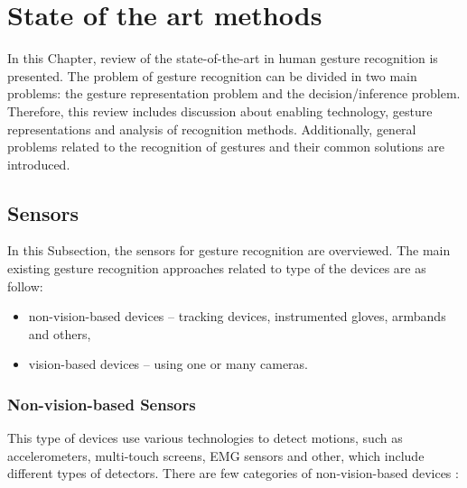 \section{State of the art methods}
In this Chapter, review of the state-of-the-art in human gesture recognition is presented. The problem of gesture recognition can be divided in two main problems: the gesture representation problem and the decision/inference problem. Therefore, this review includes discussion about enabling technology, gesture representations and analysis of recognition methods. Additionally, general problems related to the recognition of gestures and their common solutions are introduced.

\subsection{Sensors}
In this Subsection, the sensors for gesture recognition are overviewed. The main existing gesture recognition approaches related to type of the devices are as follow:
\begin{itemize}
\item non-vision-based devices -- tracking devices, instrumented gloves, armbands and others,
\item vision-based devices -- using one or many cameras.
\end{itemize}

\subsubsection{Non-vision-based Sensors}

This type of devices use various technologies to detect motions, such as accelerometers, multi-touch screens, EMG sensors and other, which include different types of detectors. There are few categories of non-vision-based devices \cite{kaaniche2009human}:

